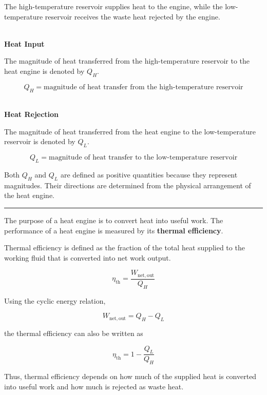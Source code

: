 \documentclass[12pt]{article}
\newcommand{\mysubsection}[2]{%
    \vspace{5px}
    \noindent{\headingfont\large #1\space #2\par}
    \vspace{4pt}
    \hrule
    \vspace{15pt}
}
\begin{document}
The high-temperature reservoir supplies heat to the engine, while the low-temperature reservoir receives the waste heat rejected by the engine.

\textbf{\\ Heat Input}

The magnitude of heat transferred from the high-temperature reservoir to the heat engine is denoted by $Q_H$.

\begin{equation*}
Q_H = \text{magnitude of heat transfer from the high-temperature reservoir}
\end{equation*}

\textbf{\\ Heat Rejection}

The magnitude of heat transferred from the heat engine to the low-temperature reservoir is denoted by $Q_L$.

\begin{equation*}
Q_L = \text{magnitude of heat transfer to the low-temperature reservoir}
\end{equation*}

Both $Q_H$ and $Q_L$ are defined as positive quantities because they represent magnitudes. Their directions are determined from the physical arrangement of the heat engine.

\newpage
\mysubsection{}{Thermal Efficiency}

The purpose of a heat engine is to convert heat into useful work. The performance of a heat engine is measured by its \textbf{thermal efficiency}.

Thermal efficiency is defined as the fraction of the total heat supplied to the working fluid that is converted into net work output.

\begin{equation*}
\eta_{\mathrm{th}} =
\frac{W_{\mathrm{net,out}}}{Q_H}
\end{equation*}

Using the cyclic energy relation,

\begin{equation*}
W_{\mathrm{net,out}} = Q_H - Q_L
\end{equation*}

the thermal efficiency can also be written as

\begin{equation*}
\eta_{\mathrm{th}} =
1-\frac{Q_L}{Q_H}
\end{equation*}

Thus, thermal efficiency depends on how much of the supplied heat is converted into useful work and how much is rejected as waste heat.
\end{document}
